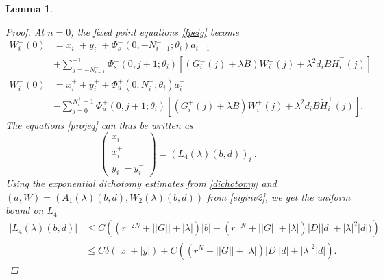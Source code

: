 \documentclass[12pt]{elsarticle}
\newtheorem{lemma}{Lemma}
\begin{document}
\begin{lemma}
\begin{proof}
At $n = 0$, the fixed point equations \cref{fpeig} become 
\begin{align*}
W_i^-(0) &= x_i^- + y_i^- +
\Phi_s^-(0, -N_{i-1}^-; \theta_i) a_{i-1}^- \\
&+ \sum_{j = -N_{i-1}^-}^{-1} \Phi_s^-(0, j+1; \theta_i)
[(G_i^-(j) + \lambda B) W_i^-(j) + \lambda^2 d_i B \tilde{H}_i^-(j)] \\
W_i^+(0) &= x_i^+ + y_i^+ + \Phi_u^+(0, N_i^+; \theta_i) a_i^+ \\
&- \sum_{j = 0}^{N_i^+-1} \Phi_u^+(0, j+1; \theta_i) 
[(G_i^+(j) + \lambda B) W_i^+(j) + \lambda^2 d_i B \tilde{H}_i^+(j)].
\end{align*}
The equations \cref{projeq} can thus be written as
\begin{equation}\label{projeq2}
\begin{pmatrix}
x_i^- \\ x_i^+ \\ y_i^+ - y_i^-
\end{pmatrix}
= (L_4(\lambda)(b,d))_i \:.
\end{equation}
Using the exponential dichotomy estimates from \cref{dichotomy} and $(a, W) = (A_1(\lambda)(b,d), W_2(\lambda)(b,d))$ from \cref{eiginv2}, we get the uniform bound on $L_4$
\begin{align*}
|L_4(\lambda)(b,d)| 
&\leq C \left( (r^{-2N} + ||G|| + |\lambda|)|b| + 
(r^{-N} + ||G|| + |\lambda|)|D| |d| + |\lambda|^2 |d| )
\right) \\
&\leq C \delta(|x| + |y|) + C \left( (r^{N} + ||G|| + |\lambda|)|D| |d| + |\lambda|^2 |d| \right).
\end{align*}


\end{proof}
\end{lemma}
\end{document}
